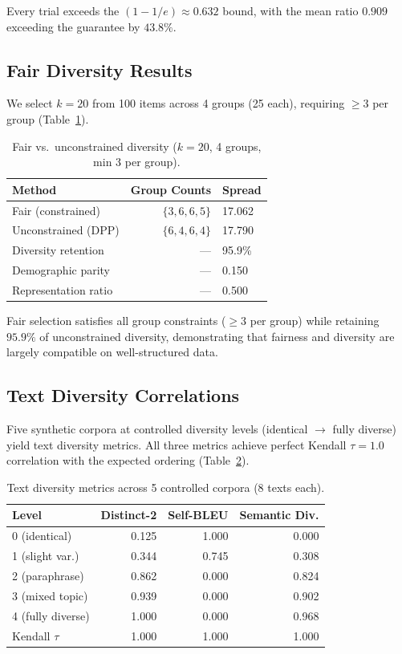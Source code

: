 \documentclass[11pt]{article}
\begin{document}
Every trial exceeds the $(1{-}1/e) \approx 0.632$ bound, with the mean ratio
$0.909$ exceeding the guarantee by $43.8\%$.

\subsection{Fair Diversity Results}

We select $k{=}20$ from 100 items across 4 groups (25 each), requiring
$\geq 3$ per group (Table~\ref{tab:fair-results}).

\begin{table}[t]
\centering
\caption{Fair vs.\ unconstrained diversity ($k{=}20$, 4 groups, min 3 per group).}
\label{tab:fair-results}
\begin{tabular}{lrl}
\toprule
\textbf{Method} & \textbf{Group Counts} & \textbf{Spread} \\
\midrule
Fair (constrained) & $\{3, 6, 6, 5\}$ & 17.062 \\
Unconstrained (DPP) & $\{6, 4, 6, 4\}$ & 17.790 \\
\midrule
Diversity retention & --- & 95.9\% \\
Demographic parity & --- & 0.150 \\
Representation ratio & --- & 0.500 \\
\bottomrule
\end{tabular}
\end{table}

Fair selection satisfies all group constraints ($\geq 3$ per group) while
retaining $95.9\%$ of unconstrained diversity, demonstrating that fairness
and diversity are largely compatible on well-structured data.

\subsection{Text Diversity Correlations}

Five synthetic corpora at controlled diversity levels (identical $\to$ fully
diverse) yield text diversity metrics. All three metrics achieve perfect
Kendall $\tau = 1.0$ correlation with the expected ordering
(Table~\ref{tab:text-corr}).

\begin{table}[t]
\centering
\caption{Text diversity metrics across 5 controlled corpora (8 texts each).}
\label{tab:text-corr}
\begin{tabular}{lrrr}
\toprule
\textbf{Level} & \textbf{Distinct-2} & \textbf{Self-BLEU} & \textbf{Semantic Div.} \\
\midrule
0 (identical) & 0.125 & 1.000 & 0.000 \\
1 (slight var.) & 0.344 & 0.745 & 0.308 \\
2 (paraphrase) & 0.862 & 0.000 & 0.824 \\
3 (mixed topic) & 0.939 & 0.000 & 0.902 \\
4 (fully diverse) & 1.000 & 0.000 & 0.968 \\
\midrule
Kendall $\tau$ & 1.000 & 1.000 & 1.000 \\
\bottomrule
\end{tabular}
\end{table}
\end{document}
